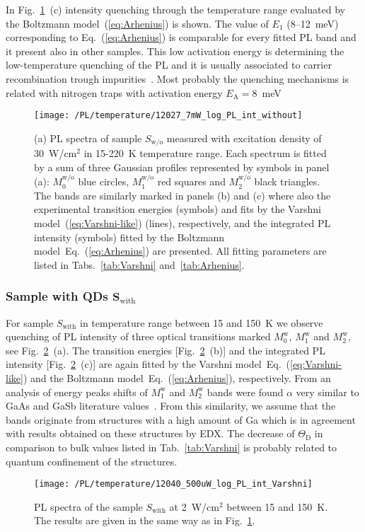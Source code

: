  In Fig.~\ref{fig:QD_wo_temp}~(c) intensity quenching through the temperature range evaluated by the Boltzmann model~(\ref{eq:Arhenius}) is shown. The value of $E_1$ (8--12~meV) corresponding to Eq.~(\ref{eq:Arhenius}) is comparable for every fitted PL band and it present also in other samples. This low activation energy is determining the low-temperature quenching of the PL and it is usually associated to carrier recombination trough impurities~\cite{YuCardona}. Most probably the quenching mechanisms is related with nitrogen traps with activation energy $E_\mathrm{A}=8$~meV~\cite{ioffe}
%
\begin{figure}
	\centering
	\texttt{[image: /PL/temperature/12027\_7mW\_log\_PL\_int\_without]}
	\caption{(a) PL spectra of sample $S_\mathrm{w/o}$ measured with excitation density of 30~W/cm$^2$ in 15-220~K temperature range. Each spectrum is fitted by a sum of three Gaussian profiles represented by symbols in panel (a): $M_0^\mathrm{w/o}$ blue circles, $M_1^\mathrm{w/o}$ red squares and $M_2^\mathrm{w/o}$ black triangles. The bands are similarly marked in panels (b) and (c) where also the experimental transition energies (symbols) and fits by the Varshni model~(\ref{eq:Varshni-like}) (lines), respectively, and the integrated PL intensity (symbols) fitted by the Boltzmann model~Eq.~(\ref{eq:Arhenius}) are presented. All fitting parameters are listed in Tabs.~\ref{tab:Varshni} and~\ref{tab:Arhenius}.}
	\label{fig:QD_wo_temp}
\end{figure}


\subsubsection*{Sample with QDs $\mathbf{S_\mathrm{with}}$}
%
For sample $S_\mathrm{with}$ in temperature range between 15 and 150~K we observe quenching of PL intensity of three optical transitions marked $M_0^\mathrm{w}$, $M_1^\mathrm{w}$ and $M_2^\mathrm{w}$, see Fig.~\ref{fig:QD_w_temp}~(a). The transition energies [Fig.~\ref{fig:QD_w_temp}~(b)] and the integrated PL intensity [Fig.~\ref{fig:QD_w_temp}~(c)] are again fitted by the Varshni model~Eq.~(\ref{eq:Varshni-like}) and the Boltzmann model~Eq.~(\ref{eq:Arhenius}), respectively.%
%
From an analysis of energy peaks shifts of $M_1^\mathrm{w}$ and $M_2^\mathrm{w}$ bands were found $\alpha$ very similar to GaAs and GaSb literature values~\cite{Vurgaftman}. From this similarity, we assume that the bands originate from structures with a high amount of Ga which is in agreement with results obtained on these structures by EDX. The decrease of $\Theta_\mathrm{D}$ in comparison to bulk values listed in Tab.~\ref{tab:Varshni} is probably related to quantum confinement of the structures.
%
\begin{figure}
	\centering
	\texttt{[image: /PL/temperature/12040\_500uW\_log\_PL\_int\_Varshni]}
	\caption{PL spectra of the sample ${S_\mathrm{with}}$ at 2~W/cm$^2$ between 15 and 150~K. The results are given in the same way as in Fig.~\ref{fig:QD_wo_temp}.}
	\label{fig:QD_w_temp}
\end{figure}

